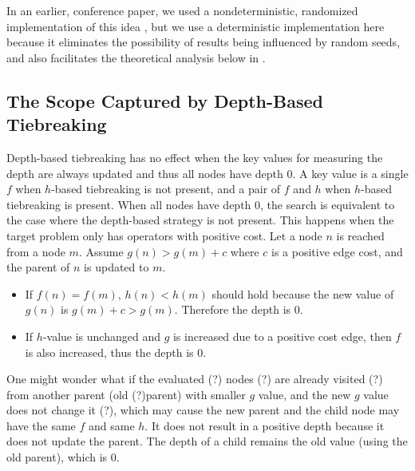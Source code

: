 In an earlier, conference paper, we used a nondeterministic,
randomized implementation of this idea \cite{Asai16}, but we use a deterministic
implementation here because it eliminates the possibility of results being influenced by random seeds,
and also facilitates the  theoretical analysis below in .


\subsection{The Scope Captured by Depth-Based Tiebreaking}

Depth-based tiebreaking has no effect when the key values for measuring
the depth are always updated and thus all nodes have depth 0. A key
value is a single $f$ when $h$-based tiebreaking is not present, and a
pair of $f$ and $h$ when $h$-based tiebreaking is present. When all
nodes have depth 0, the search is equivalent to the case where 
the depth-based strategy is not present.
% 
This happens when the target problem only has 
operators with positive cost. %
Let a node $n$ is reached from a node $m$. 
Assume
 $g(n)>g(m)+c$ where $c$ is a positive edge cost, and the parent of $n$
 is updated to $m$.

\begin{itemize}
 \item 
       If $f(n)=f(m)$, $h(n)<h(m)$ should hold because the new value of
       $g(n)$ is $g(m)+c>g(m)$. Therefore the depth is 0.
 \item If $h$-value is unchanged and $g$ is increased due to a positive
       cost edge, then $f$ is also increased, thus the depth is 0.
\end{itemize}

One might wonder what if the evaluated (?) nodes (?) are already visited (?) from
another parent (old (?)parent) with smaller $g$ value, and the new $g$ value does not change it (?),
which may cause the new parent and the child node may have the same $f$ and
same $h$. It does not result in a positive depth because it does not update the parent. The depth of a
child remains the old value (using the old parent), which is 0.


